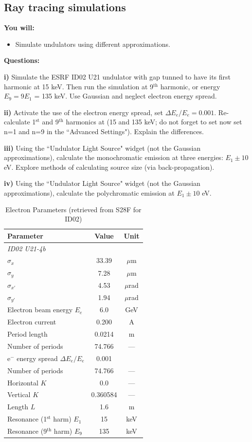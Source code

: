 \subsection{Ray tracing simulations}

\textbf{You will:}

\begin{itemize}
    \item Simulate undulators using different approximations.
\end{itemize}

\textbf{Questions:}


\textbf{i)} Simulate the ESRF ID02 U21 undulator with gap tunned to have its first harmonic at 15 keV. Then run the simulation at 9$^\text{th}$ harmonic, or energy $E_9= 9 E_1$ = 135 keV. Use Gaussian and neglect electron energy spread.

\textbf{ii)} Activate the use of the electron energy spread, set $\Delta E_e/E_e = 0.001$. Re-calculate  1$^\text{st}$ and  9$^\text{th}$ harmonics at (15 and 135 keV; do not forget to set now set n=1 and n=9 in the ``Advanced Settings"). Explain the differences.

\textbf{iii)} Using the ``Undulator Light Source" widget (not the Gaussian approximations), calculate the monochromatic emission at three energies: $E_1\pm 10$ eV. Explore methods of calculating source size (via back-propagation). 

\textbf{iv)} Using the ``Undulator Light Source" widget (not the Gaussian approximations), calculate the polychromatic emission at $E_1\pm 10$ eV.  

\begin{table}[H]
\centering
\caption{Electron Parameters (retrieved from S28F for ID02)}
\begin{tabular}{lcc}
\hline
\textbf{Parameter} & \textbf{Value} & \textbf{Unit} \\
\hline
\multicolumn{3}{l}{\textit{ID02 U21-4b}} \\
\hline
$\sigma_x$ & 33.39 & $\mu$m \\
$\sigma_y$ & 7.28 & $\mu$m \\
$\sigma_{x'}$ & 4.53 & $\mu$rad \\
$\sigma_{y'}$ & 1.94 & $\mu$rad \\
Electron beam energy $E_e$ & 6.0 & GeV \\
Electron current & 0.200 & A \\
\hline
Period length & 0.0214 & m \\
Number of periods & 74.766 & ---\\
e$^-$ energy spread $\Delta E_e/E_e$ & 0.001 &  \\
Number of periods & 74.766 & ---\\
Horizontal $K$ & 0.0 & --- \\
Vertical $K$ & 0.360584 & --- \\
Length $L$ & 1.6 & m \\
Resonance (1$^\text{st}$ harm) $E_1$ & 15 & keV \\
Resonance (9$^\text{th}$ harm) $E_9$ & 135 & keV \\
\hline
\end{tabular}
\label{tab:electron_params_ID02}
\end{table}


